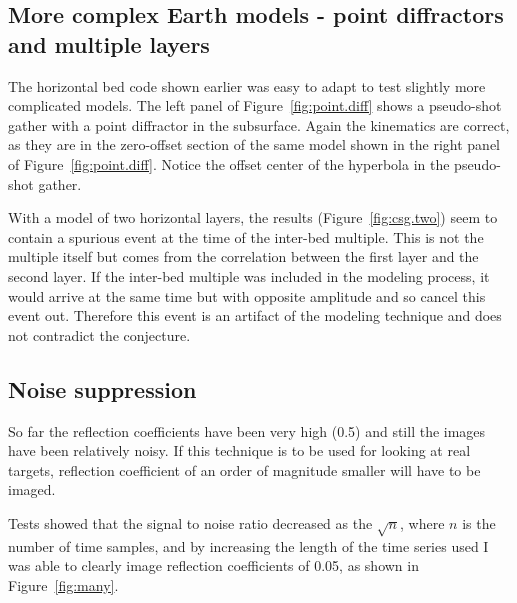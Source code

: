 \subsection{More complex Earth models - point diffractors and multiple layers}

The horizontal bed code shown earlier was easy to adapt to test 
slightly more complicated models.
The left panel of Figure~\ref{fig:point.diff} shows a pseudo-shot gather 
with a point diffractor in the subsurface. Again the kinematics are correct, 
as they are in the zero-offset section of the same model shown in the 
right panel of Figure~\ref{fig:point.diff}.  Notice the offset center of the 
hyperbola in the pseudo-shot gather.


With a model of two horizontal layers, the results (Figure~\ref{fig:csg.two}) 
seem to contain a 
spurious event at the time of the inter-bed multiple. This is not the multiple 
itself but comes from the correlation between the first layer and the
second layer.  If the inter-bed multiple was included in the modeling process, 
it would arrive at the same time but with opposite amplitude and so 
cancel this event out. Therefore this event is an artifact of the modeling 
technique and does not contradict the conjecture.


\subsection{Noise suppression}

So far the reflection coefficients have been very high (0.5) and still the 
images have been relatively noisy. If this 
technique is to be used for looking at real targets, reflection coefficient 
of an order of magnitude smaller will have to be imaged.

Tests showed that the signal to noise ratio decreased as the $\sqrt{n}$, 
where $n$ is the number of time samples, and by increasing the length 
of the time series used I was able to clearly image reflection coefficients
of 0.05, as shown in Figure~\ref{fig:many}.


